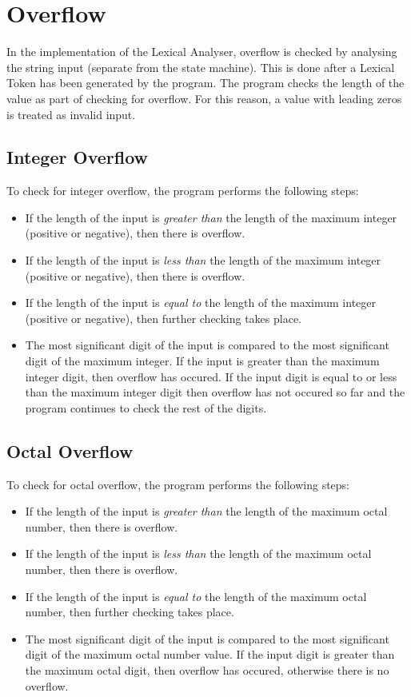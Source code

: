 \documentclass[11pt]{article}
\begin{document}
\newpage
\section{Overflow}
In the implementation of the Lexical Analyser, overflow is checked by analysing the string input (separate from the state machine). This is done after a Lexical Token has been generated by the program. The program checks the length of the value as part of checking for overflow. For this reason, a value with leading zeros is treated as invalid input. 
\subsection{Integer Overflow}
To check for integer overflow, the program performs the following steps:
\begin{itemize}
\item If the length of the input is \textit{greater than} the length of the maximum integer (positive or negative), then there is overflow.
\item If the length of the input is \textit{less than} the length of the maximum integer (positive or negative), then there is overflow.
\item If the length of the input is \textit{equal to} the length of the maximum integer (positive or negative), then further checking takes place.
\item The most significant digit of the input is compared to the most significant digit of the maximum integer. If the input is greater than the maximum integer digit, then overflow has occured. If the input digit is equal to or less than the maximum integer digit then overflow has not occured so far and the program continues to check the rest of the digits.
\end{itemize}
\subsection{Octal Overflow}
To check for octal overflow, the program performs the following steps:
\begin{itemize}
\item If the length of the input is \textit{greater than} the length of the maximum octal number, then there is overflow.
\item If the length of the input is \textit{less than} the length of the maximum octal number, then there is overflow.
\item If the length of the input is \textit{equal to} the length of the maximum octal number, then further checking takes place.
\item The most significant digit of the input is compared to the most significant digit of the maximum octal number value. If the input digit is greater than the maximum octal digit, then overflow has occured, otherwise there is no overflow.
\end{itemize}
\end{document}
